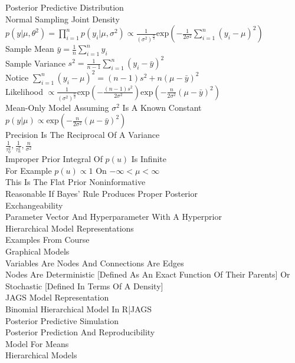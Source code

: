 Posterior Predictive Distribution \\
Normal Sampling Joint Density $p(y|\mu,\theta^2)=\prod_{i=1}^n p(y_i|\mu,\sigma^2) \propto \frac{1}{(\sigma^2)^{\frac{n}{2}}}\text{exp}\left(-\frac{1}{2\sigma^2}\sum_{i=1}^n (y_i-\mu)^2 \right)$ \\
Sample Mean $\bar{y}=\frac{1}{n}\sum_{i=1}^n y_i$ \\
Sample Variance $s^2=\frac{1}{n-1}\sum_{i=1}^n (y_i-\bar{y})^2$ \\
Notice $\sum_{i=1}^n (y_i-\mu)^2=(n-1)s^2+n(\mu-\bar{y})^2$ \\
Likelihood $\propto \frac{1}{(\sigma^2)^{\frac{n}{2}}}\text{exp}\left(-\frac{(n-1)s^2}{2\sigma^2} \right)\text{exp}\left(-\frac{n}{2\sigma^2}(\mu-\bar{y})^2 \right)$ \\
Mean-Only Model Assuming $\sigma^2$ Is A Known Constant \\
$p(y|\mu)\propto \text{exp}\left(-\frac{n}{2\sigma^2}(\mu-\bar{y})^2 \right)$ \\
Precision Is The Reciprocal Of A Variance \\
$\frac{1}{\tau_0^2}, \frac{1}{\tau_n^2}, \frac{n}{\sigma^2}$ \\
Improper Prior Integral Of $p(u)$ Is Infinite \\
For Example $p(u)\propto 1$ On $-\infty<\mu<\infty$ \\
This Is The Flat Prior Noninformative \\
Reasonable If Bayes' Rule Produces Proper Posterior \\
Exchangeability \\
Parameter Vector And Hyperparameter With A Hyperprior \\
Hierarchical Model Representations \\
Examples From Course \\
Graphical Models \\
Variables Are Nodes And Connections Are Edges \\
Nodes Are Deterministic [Defined As An Exact Function Of Their Parents] Or Stochastic [Defined In Terms Of A Density] \\
JAGS Model Representation \\
Binomial Hierarchical Model In R|JAGS \\
Posterior Predictive Simulation \\
Posterior Prediction And Reproducibility \\
Model For Means \\
Hierarchical Models \\
